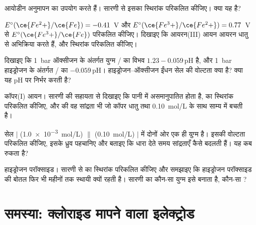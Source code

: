 \begin{exercise}[$\star\star$]\label{exo:b1:nernst:7}
आयोडीन अनुमापन  का उपयोग करते हैं। सारणी से इसका
स्थिरांक परिकलित कीजिए। क्या यह  है?
\end{exercise}

\begin{exercise}[$\star\star$]\label{exo:b1:nernst:8}
$E^\circ(\ce{Fe^2+}/\ce{Fe}) = -0.41$~V और $E^\circ(\ce{Fe^3+}/\ce{Fe^2+})
= 0.77$~V से $E^\circ(\ce{Fe^3+}/\ce{Fe})$ परिकलित कीजिए। दिखाइए कि आयरन(III) आयन
आयरन धातु से अभिक्रिया करते हैं, और स्थिरांक परिकलित कीजिए।
\end{exercise}

\begin{exercise}[$\star\star$]\label{exo:b1:nernst:9}
दिखाइए कि \qty{1}{bar}
ऑक्सीजन के अंतर्गत युग्म / का विभव $1.23 - 0.059\,\mathrm{pH}$ है, और
\qty{1}{bar} हाइड्रोजन के अंतर्गत / का $-0.059\,\mathrm{pH}$। हाइड्रोजन--ऑक्सीजन
ईंधन सेल की वोल्टता क्या है? क्या यह pH पर निर्भर करती है?
\end{exercise}

\begin{exercise}[$\star\star\star$]\label{exo:b1:nernst:10}
कॉपर(I) आयन। सारणी की सहायता से दिखाइए कि  पानी में असमानुपातित
होता है,  का स्थिरांक परिकलित कीजिए, और  की
वह सांद्रता भी जो कॉपर धातु तथा \qty{0.10}{mol/L}  के साथ
साम्य में बचती है।
\end{exercise}

\begin{exercise}[$\star\star\star$]\label{exo:b1:nernst:11}
सेल  $|$  (\qty{1.0e-3}{mol/L}) $\|$ 
(\qty{0.10}{mol/L}) $|$  में दोनों ओर एक ही युग्म है।
इसकी वोल्टता परिकलित कीजिए, इसके ध्रुव पहचानिए और बताइए कि धारा देते समय
सांद्रताएँ कैसे बदलती हैं। यह कब रुकता है?
\end{exercise}

\begin{exercise}[$\star\star\star$]\label{exo:b1:nernst:12}
हाइड्रोजन परॉक्साइड। सारणी से
 का स्थिरांक परिकलित कीजिए और समझाइए कि हाइड्रोजन परॉक्साइड की बोतल
फिर भी महीनों तक स्थायी क्यों रहती है। सारणी का कौन-सा युग्म इसे
 बनाता है, कौन-सा ?
\end{exercise}

\section{समस्या: क्लोराइड मापने वाला इलेक्ट्रोड}

